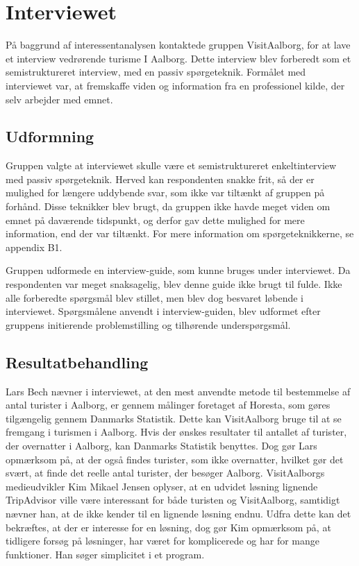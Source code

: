 \section{Interviewet}
På baggrund af interessentanalysen kontaktede gruppen VisitAalborg, for at lave et interview vedrørende turisme I Aalborg. Dette interview blev forberedt som et semistruktureret interview, med en passiv spørgeteknik. Formålet med interviewet var, at fremskaffe viden og information fra en professionel kilde, der selv arbejder med emnet.

\subsection{Udformning}
Gruppen valgte at interviewet skulle være et semistruktureret enkeltinterview med passiv spørgeteknik. Herved kan respondenten snakke frit, så der er mulighed for længere uddybende svar, som ikke var tiltænkt af gruppen på forhånd. Disse teknikker blev brugt, da gruppen ikke havde meget viden om emnet på daværende tidspunkt, og derfor gav dette mulighed for mere information, end der var tiltænkt. For mere information om spørgeteknikkerne, se appendix B1.

Gruppen udformede en interview-guide, som kunne bruges under interviewet. Da respondenten var meget snaksagelig, blev denne guide ikke brugt til fulde. Ikke alle forberedte spørgsmål blev stillet, men blev dog besvaret løbende i interviewet. Spørgsmålene anvendt i interview-guiden, blev udformet efter gruppens initierende problemstilling og tilhørende underspørgsmål.
\subsection{Resultatbehandling}
Lars Bech nævner i interviewet, at den mest anvendte metode til bestemmelse af antal turister i Aalborg, er gennem målinger foretaget af Horesta, som gøres tilgængelig gennem Danmarks Statistik. Dette kan VisitAalborg bruge til at se fremgang i turismen i Aalborg. Hvis der ønskes resultater til antallet af turister, der overnatter i Aalborg, kan Danmarks Statistik benyttes. Dog gør Lars opmærksom på, at der også findes turister, som ikke overnatter, hvilket gør det svært, at finde det reelle antal turister, der besøger Aalborg.
VisitAalborgs medieudvikler Kim Mikael Jensen oplyser, at en udvidet løsning lignende TripAdvisor ville være interessant for både turisten og VisitAalborg, samtidigt nævner han, at de ikke kender til en lignende løsning endnu. Udfra dette kan det bekræftes, at der er interesse for en løsning, dog gør Kim opmærksom på, at tidligere forsøg på løsninger, har været for komplicerede og har for mange funktioner. Han søger simplicitet i et program.

